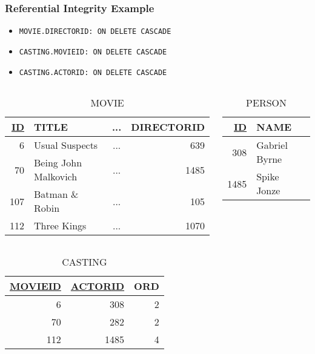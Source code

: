 \documentclass[dvipsnames]{beamer}
\theoremstyle{plain}
\begin{document}
\begin{frame}
  \frametitle{Referential Integrity Example}

  \begin{itemize}
    \item \lstinline!MOVIE.DIRECTORID: ON DELETE CASCADE!
    \item \lstinline!CASTING.MOVIEID: ON DELETE CASCADE!
    \item \lstinline!CASTING.ACTORID: ON DELETE CASCADE!
  \end{itemize}

  \vspace{-24pt}
  \begin{columns}
    \begin{tiny}
    \begin{table}
      \caption{MOVIE}
      \begin{tabular}{|r|l|c|r|}\hline
\underline{ID} & TITLE             & ... & DIRECTORID\\[2pt]\hline\hline
          6 & Usual Suspects       & ... &        639\\\hline
         70 & Being John Malkovich & ... &       1485\\\hline
        107 & Batman \& Robin      & ... &        105\\\hline
        112 & Three Kings          & ... &       1070\\\hline
      \end{tabular}
    \end{table}
    \end{tiny}

    \begin{tiny}
    \begin{table}
      \caption{PERSON}
      \begin{tabular}{|r|l|}\hline
\underline{ID} & NAME\\[2pt]\hline\hline
           308 & Gabriel Byrne\\\hline
          1485 & Spike Jonze  \\\hline
      \end{tabular}
    \end{table}
    \end{tiny}
  \end{columns}

  \vspace{-12pt}
  \begin{tiny}
  \begin{table}
    \caption{CASTING}
    \begin{tabular}{|r|r|r|}\hline
\underline{MOVIEID} & \underline{ACTORID} & ORD\\[2pt]\hline\hline
                  6 &                 308 &   2\\\hline
                 70 &                 282 &   2\\\hline
                112 &                1485 &   4\\\hline
    \end{tabular}
  \end{table}
  \end{tiny}


\end{frame}
\end{document}

